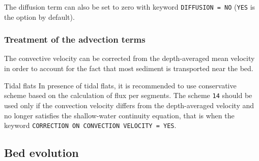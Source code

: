 The diffusion term can also be set to zero with keyword \texttt{DIFFUSION = NO} (\texttt{YES} is the option by default).



\subsubsection{Treatment of the advection terms}
The convective velocity can be corrected from the depth-averaged
mean velocity in order to account for the fact that most sediment is
transported near the bed.

\begin{bclogo}[couleur = blue!10, arrondi = 0.10, logo = \bcattention]{\textsf{Tidal flats}}
In presence of tidal flats, it is recommended to use conservative
scheme based on the calculation of flux per segments. The scheme \texttt{14} should
be used only if the convection velocity differs from the depth-averaged velocity
and no longer satisfies the shallow-water continuity equation, that is when the keyword \texttt{CORRECTION ON CONVECTION VELOCITY = YES}.
\end{bclogo}

\subsection{Bed evolution}
